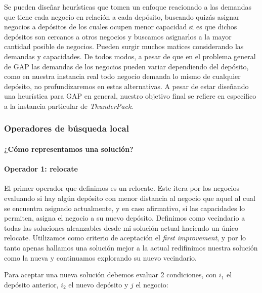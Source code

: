 \documentclass[
]{article}
\begin{document}
Se pueden diseñar heurísticas que tomen un enfoque reacionado a las
demandas que tiene cada negocio en relación a cada depósito, buscando
quizás asignar negocios a depósitos de los cuales ocupen menor capacidad
si es que dichos depósitos son cercanos a otros negocios y buscamos
asignarlos a la mayor cantidad posible de negocios. Pueden surgir muchos
matices considerando las demandas y capacidades. De todos modos, a pesar
de que en el problema general de GAP las demandas de los negocios pueden
variar dependiendo del depósito, como en nuestra instancia real todo
negocio demanda lo mismo de cualquier depósito, no profundizaremos en
estas alternativas. A pesar de estar diseñando una heurística para GAP
en general, nuestro objetivo final se refiere en específico a la
instancia particular de \emph{ThunderPack}.

\hypertarget{operadores-de-buxfasqueda-local}{%
\subsubsection{Operadores de búsqueda
local}\label{operadores-de-buxfasqueda-local}}

\hypertarget{cuxf3mo-representamos-una-soluciuxf3n}{%
\paragraph{¿Cómo representamos una
solución?}\label{cuxf3mo-representamos-una-soluciuxf3n}}

\hypertarget{operador-1-relocate}{%
\paragraph{Operador 1: relocate}\label{operador-1-relocate}}

El primer operador que definimos es un relocate. Este itera por los
negocios evaluando si hay algún depósito con menor distancia al negocio
que aquel al cual se encuentra asignado actualmente, y en caso
afirmativo, si las capacidades lo permiten, asigna el negocio a su nuevo
depósito. Definimos como vecindario a todas las soluciones alcanzables
desde mi solución actual haciendo un único relocate. Utilizamos como
criterio de aceptación el \emph{first improvement}, y por lo tanto
apenas hallamos una solución mejor a la actual redifinimos nuestra
solución como la nueva y continuamos explorando su nuevo vecindario.

Para aceptar una nueva solución debemos evaluar 2 condiciones, con
\(i_1\) el depósito anterior, \(i_2\) el nuevo depósito y \(j\) el
negocio:
\end{document}
